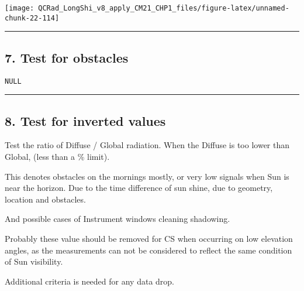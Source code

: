 \documentclass[
  10pt,
  a4paper,oneside]{article}
\begin{document}
\begin{center}\texttt{[image: QCRad\_LongShi\_v8\_apply\_CM21\_CHP1\_files/figure-latex/unnamed-chunk-22-114]} \end{center}

\begin{center}\rule{0.5\linewidth}{0.5pt}\end{center}

\newpage

\hypertarget{test-for-obstacles}{%
\subsection{7. Test for obstacles}\label{test-for-obstacles}}

\begin{verbatim}
NULL
\end{verbatim}

\begin{center}\rule{0.5\linewidth}{0.5pt}\end{center}

\newpage

\hypertarget{test-for-inverted-values}{%
\subsection{8. Test for inverted values}\label{test-for-inverted-values}}

Test the ratio of Diffuse / Global radiation.
When the Diffuse is too lower than Global, (less than a \% limit).

This denotes obstacles on the mornings mostly, or very low
signals when Sun is near the horizon.
Due to the time difference of sun shine, due to geometry, location and
obstacles.

And possible cases of Instrument windows cleaning shadowing.

Probably these value should be removed for CS when occurring on low
elevation angles, as the measurements can not be considered to reflect
the same condition of Sun visibility.

Additional criteria is needed for any data drop.
\end{document}
